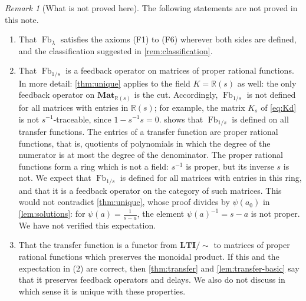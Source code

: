 \documentclass[11pt,a4paper]{article}
\theoremstyle{plain}
\theoremstyle{definition}
\theoremstyle{remark}
\newtheorem{remark}[theorem]{Remark}
\DeclareMathOperator{\Fb}{Fb}
\newcommand{\Rs}{\mathbb{R}(s)}
\newcommand{\Mat}{\mathbf{Mat}}
\newcommand{\LTIq}{\mathbf{LTI}/{\sim}}
\begin{document}
\begin{remark}[What is not proved here]
    \label{rem:not-proved}
    The following statements are not proved in this note.
    \begin{enumerate}[label=\textup{(\arabic*)}]
        \item That $\Fb_\lambda$ satisfies the axioms (F1) to (F6) wherever both sides are defined, and the classification suggested in \cref{rem:classification}.
        \item That $\Fb_{1/s}$ is a feedback operator on matrices of proper rational functions.
              In more detail: \cref{thm:unique} applies to the field $K = \Rs$ as well: the only feedback operator on $\Mat_{\Rs}$ is the cut.
              Accordingly, $\Fb_{1/s}$ is not defined for all matrices with entries in $\Rs$; for example, the matrix $K_s$ of \cref{eq:Kd} is not $s^{-1}$-traceable, since $1 - s^{-1} s = 0$.
               shows that $\Fb_{1/s}$ is defined on all transfer functions.
              The entries of a transfer function are proper rational functions, that is, quotients of polynomials in which the degree of the numerator is at most the degree of the denominator.
              The proper rational functions form a ring which is not a field: $s^{-1}$ is proper, but its inverse $s$ is not.
              We expect that $\Fb_{1/s}$ is defined for all matrices with entries in this ring, and that it is a feedback operator on the category of such matrices.
              This would not contradict \cref{thm:unique}, whose proof divides by $\psi(a_0)$ in \cref{lem:solutions}: for $\psi(a) = \frac{1}{s - a}$, the element $\psi(a)^{-1} = s - a$ is not proper.
              We have not verified this expectation.
        \item That the transfer function is a functor from $\LTIq$ to matrices of proper rational functions which preserves the monoidal product.
              If this and the expectation in (2) are correct, then \cref{thm:transfer} and \cref{lem:transfer-basic} say that it preserves feedback operators and delays.
              We also do not discuss in which sense it is unique with these properties.
    \end{enumerate}
\end{remark}
\end{document}
